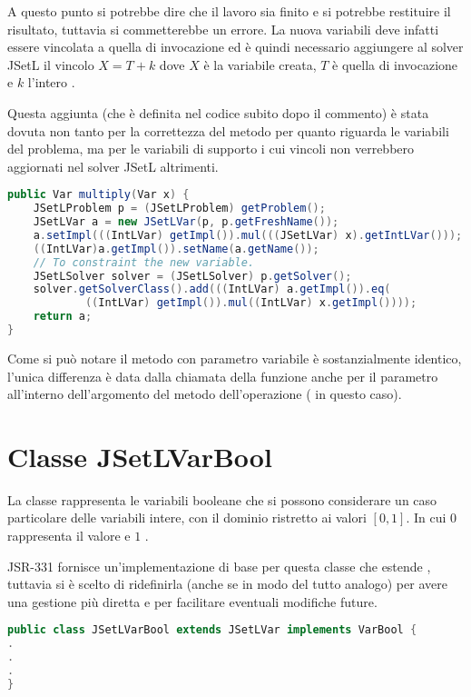 A questo punto si potrebbe dire che il lavoro sia finito e si potrebbe 
restituire il 
risultato, tuttavia si commetterebbe un errore. La nuova variabili deve infatti
essere vincolata a quella di invocazione ed è quindi necessario aggiungere al
solver JSetL il vincolo $X = T+k$ dove $X$ è la variabile creata, $T$ è
quella di invocazione e $k$ l'intero .

Questa aggiunta (che è definita nel codice subito dopo il commento) è stata
dovuta non tanto per la correttezza del metodo per quanto riguarda le variabili
del problema, ma per le variabili di supporto i cui vincoli non verrebbero 
aggiornati nel solver JSetL altrimenti.

\begin{lstlisting}[language = Java,
                   caption = {\files{multiply}, con parametro variabile.}]
public Var multiply(Var x) {
	JSetLProblem p = (JSetLProblem) getProblem();
	JSetLVar a = new JSetLVar(p, p.getFreshName());
	a.setImpl(((IntLVar) getImpl()).mul(((JSetLVar) x).getIntLVar()));
	((IntLVar)a.getImpl()).setName(a.getName());
	// To constraint the new variable.
	JSetLSolver solver = (JSetLSolver) p.getSolver();
	solver.getSolverClass().add(((IntLVar) a.getImpl()).eq(
			((IntLVar) getImpl()).mul((IntLVar) x.getImpl())));
	return a;
}
\end{lstlisting}
Come si può notare il metodo con parametro variabile è sostanzialmente identico,
l'unica differenza è data dalla chiamata della funzione  anche
per il parametro all'interno dell'argomento del metodo dell'operazione 
 ( in questo caso).

\section{Classe JSetLVarBool}
La classe  rappresenta le variabili booleane che si possono 
considerare un caso particolare 
delle variabili intere, con il dominio ristretto ai valori $[0,1]$. In cui
$0$ rappresenta il valore  e $1$ .

JSR-331 fornisce un'implementazione di base per questa classe che estende
, tuttavia si è scelto di ridefinirla (anche se in modo del tutto
analogo) per avere una gestione più diretta e per facilitare eventuali
modifiche future.
\begin{lstlisting}[language = Java,
                   caption = {La classe \files{JSetLVarBool}}]
public class JSetLVarBool extends JSetLVar implements VarBool {
.
.
.
}
\end{lstlisting}
